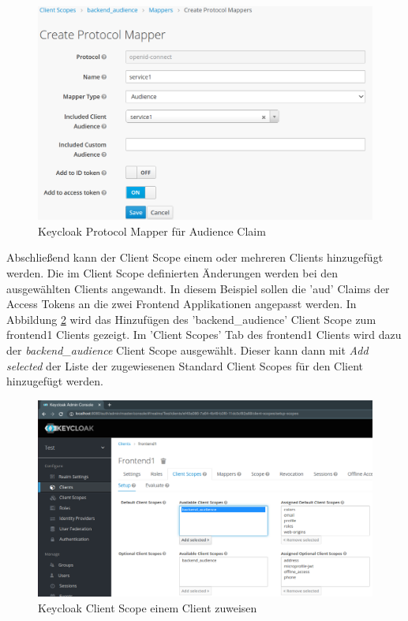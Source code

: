\begin{figure}[!ht]
	\centering
	\includegraphics[width=1\textwidth]{Images/Ebert/KeycloakNewAudProtocolMapper.PNG}
	\caption{Keycloak Protocol Mapper für Audience Claim}
	\label{fig:EB_Keycloak Protocol Mapper für Audience Claim}
\end{figure}

Abschließend kann der Client Scope einem oder mehreren Clients hinzugefügt werden. Die im Client Scope definierten Änderungen werden bei den ausgewählten Clients angewandt. In diesem Beispiel sollen die 'aud' Claims der Access Tokens an die zwei Frontend Applikationen angepasst werden. In Abbildung \ref{fig:EB_Keycloak Client Scope einem Client zuweisen} wird das Hinzufügen des 'backend\_audience' Client Scope zum frontend1 Clients gezeigt. Im 'Client Scopes' Tab des frontend1 Clients wird dazu der \textit{backend\_audience} Client Scope ausgewählt. Dieser kann dann mit \textit{Add selected} der Liste der zugewiesenen Standard Client Scopes für den Client hinzugefügt werden.

\begin{figure}[!ht]
	\centering
	\includegraphics[width=1\textwidth]{Images/Ebert/KeycloakAddAudClientScope.PNG}
	\caption{Keycloak Client Scope einem Client zuweisen}
	\label{fig:EB_Keycloak Client Scope einem Client zuweisen}
\end{figure}

